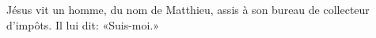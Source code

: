\encetemps Jésus vit un homme, du nom de Matthieu,
	assis à son bureau de collecteur d’impôts.
Il lui dit: «Suis-moi.»
